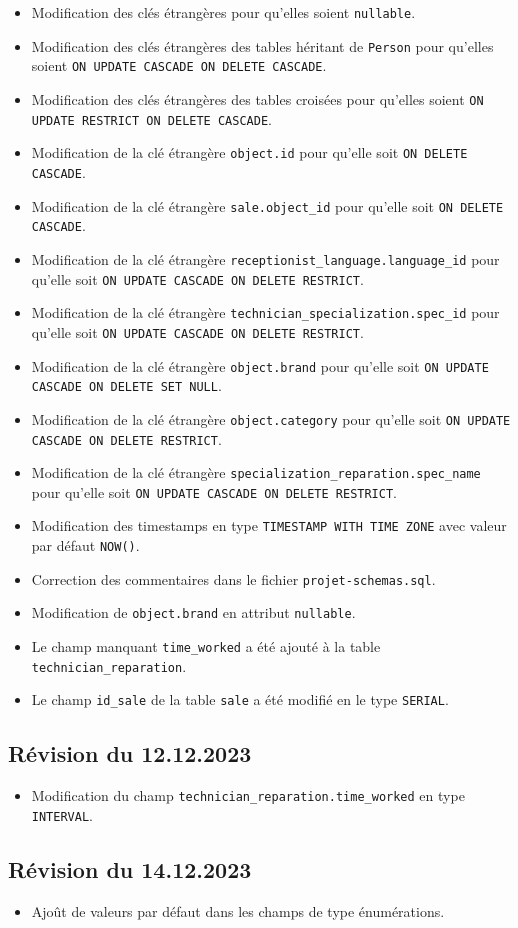 \documentclass{article}
\newcommand{\ttt}{\texttt}
\begin{document}
\begin{itemize}
    \item Modification des clés étrangères pour qu'elles soient \ttt{nullable}.
    \item Modification des clés étrangères des tables héritant de \ttt{Person} pour qu'elles soient \ttt{ON UPDATE CASCADE ON DELETE CASCADE}.
    \item Modification des clés étrangères des tables croisées pour qu'elles soient \ttt{ON UPDATE RESTRICT ON DELETE CASCADE}.
    \item Modification de la clé étrangère \ttt{object.id} pour qu'elle soit \ttt{ON DELETE CASCADE}.
    \item Modification de la clé étrangère \ttt{sale.object\_id} pour qu'elle soit \ttt{ON DELETE CASCADE}.
    \item Modification de la clé étrangère \ttt{receptionist\_language.language\_id} pour qu'elle soit \ttt{ON UPDATE CASCADE ON DELETE RESTRICT}.
    \item Modification de la clé étrangère \ttt{technician\_specialization.spec\_id} pour qu'elle soit \ttt{ON UPDATE CASCADE ON DELETE RESTRICT}.  
    \item Modification de la clé étrangère \ttt{object.brand} pour qu'elle soit \ttt{ON UPDATE CASCADE ON DELETE SET NULL}.
    \item Modification de la clé étrangère \ttt{object.category} pour qu'elle soit \ttt{ON UPDATE CASCADE ON DELETE RESTRICT}.
    \item Modification de la clé étrangère \ttt{specialization\_reparation.spec\_name} pour qu'elle soit \ttt{ON UPDATE CASCADE ON DELETE RESTRICT}.
    \item Modification des timestamps en type \ttt{TIMESTAMP WITH TIME ZONE} avec valeur par défaut \ttt{NOW()}.
    \item Correction des commentaires dans le fichier \ttt{projet-schemas.sql}.
    \item Modification de \ttt{object.brand} en attribut \ttt{nullable}.
    \item Le champ manquant \ttt{time\_worked} a été ajouté à la table \ttt{technician\_reparation}.
    \item Le champ \ttt{id\_sale} de la table \ttt{sale} a été modifié en le type \ttt{SERIAL}.
\end{itemize}

\subsection*{Révision du 12.12.2023}
\begin{itemize}
    \item Modification du champ \ttt{technician\_reparation.time\_worked} en type \ttt{INTERVAL}.
\end{itemize}

\subsection*{Révision du 14.12.2023}
\begin{itemize}
    \item Ajoût de valeurs par défaut dans les champs de type énumérations.
\end{itemize}
\end{document}
